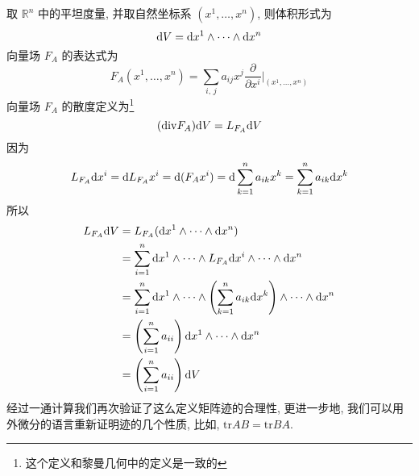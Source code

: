     取 $\mathbb{R}^n$ 中的平坦度量, 并取自然坐标系 $(x^1,\dots,x^n)$, 则体积形式为
    \begin{equation*}
        {\rm d} V = {\rm d} x^1\wedge\cdots\wedge{\rm d} x^n
    \end{equation*}
    向量场 $F_A$ 的表达式为
    \begin{equation*}
        F_A(x^1,\dots,x^n) = \sum_{i,\,j}a_{ij}x^j\frac{\partial}{\partial x^i}\Bigg|_{(x^1,\dots,x^n)}
    \end{equation*}
    向量场 $F_A$ 的散度定义为\footnote{这个定义和黎曼几何中的定义是一致的}
    \begin{equation}\label{div}
        (\mathrm{div}F_A){\rm d} V = L_{F_A}{\rm d} V
    \end{equation}
    因为
    \begin{equation*}
        L_{F_A}{\rm d} x^i = {\rm d} L_{F_A}x^i
        = {\rm d} (F_Ax^i)
        = {\rm d} \sum_{k=1}^{n}a_{ik}x^k
        = \sum_{k=1}^{n}a_{ik}{\rm d} x^k
    \end{equation*}
    所以
    \begin{align*}
        L_{F_A}{\rm d} V &= L_{F_A}({\rm d} x^1\wedge\cdots\wedge{\rm d} x^n) \\
        &= \sum_{i=1}^{n}{\rm d} x^1\wedge\cdots\wedge L_{F_A}{\rm d} x^i \wedge\cdots\wedge{\rm d} x^n \\
        &= \sum_{i=1}^{n}{\rm d} x^1\wedge\cdots\wedge\left(\sum_{k=1}^{n}a_{ik}{\rm d} x^k\right)\wedge\cdots\wedge{\rm d} x^n \\
        &= \left(\sum_{i=1}^{n}a_{ii}\right){\rm d} x^1\wedge\cdots\wedge{\rm d} x^n \\
        &= \left(\sum_{i=1}^{n}a_{ii}\right){\rm d} V
    \end{align*}
    经过一通计算我们再次验证了这么定义矩阵迹的合理性, 更进一步地, 我们可以用外微分的语言重新证明迹的几个性质, 比如, $\mathrm{tr}AB = \mathrm{tr}BA$.
    
